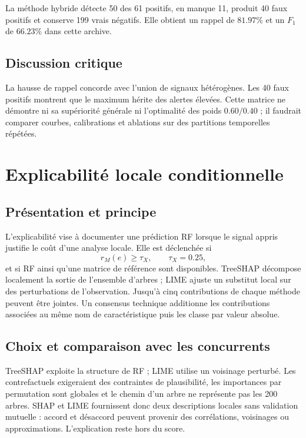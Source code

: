\documentclass[11pt,a4paper,oneside]{report}
\theoremstyle{definition}
\theoremstyle{plain}
\begin{document}
La méthode hybride détecte 50 des 61 positifs, en manque 11, produit 40 faux positifs et conserve 199 vrais négatifs. Elle obtient un rappel de $81.97\%$ et un $F_1$ de $66.23\%$ dans cette archive.

\subsection*{Discussion critique}

La hausse de rappel concorde avec l'union de signaux hétérogènes. Les 40 faux positifs montrent que le maximum hérite des alertes élevées. Cette matrice ne démontre ni sa supériorité générale ni l'optimalité des poids $0.60/0.40$ ; il faudrait comparer courbes, calibrations et ablations sur des partitions temporelles répétées.

\section{Explicabilité locale conditionnelle}
\label{sec:ai-ro-xai}

\subsection*{Présentation et principe}

L'explicabilité vise à documenter une prédiction RF lorsque le signal appris justifie le coût d'une analyse locale. Elle est déclenchée si
\begin{equation}
r_M(e)\geq\tau_X,\qquad \tau_X=0.25,
\label{eq:ai-ro-xai-gate}
\end{equation}
et si RF ainsi qu'une matrice de référence sont disponibles. TreeSHAP décompose localement la sortie de l'ensemble d'arbres ; LIME ajuste un substitut local sur des perturbations de l'observation. Jusqu'à cinq contributions de chaque méthode peuvent être jointes. Un consensus technique additionne les contributions associées au même nom de caractéristique puis les classe par valeur absolue.

\subsection*{Choix et comparaison avec les concurrents}

TreeSHAP exploite la structure de RF ; LIME utilise un voisinage perturbé. Les contrefactuels exigeraient des contraintes de plausibilité, les importances par permutation sont globales et le chemin d'un arbre ne représente pas les 200 arbres. SHAP et LIME fournissent donc deux descriptions locales sans validation mutuelle : accord et désaccord peuvent provenir des corrélations, voisinages ou approximations. L'explication reste hors du score.
\end{document}
